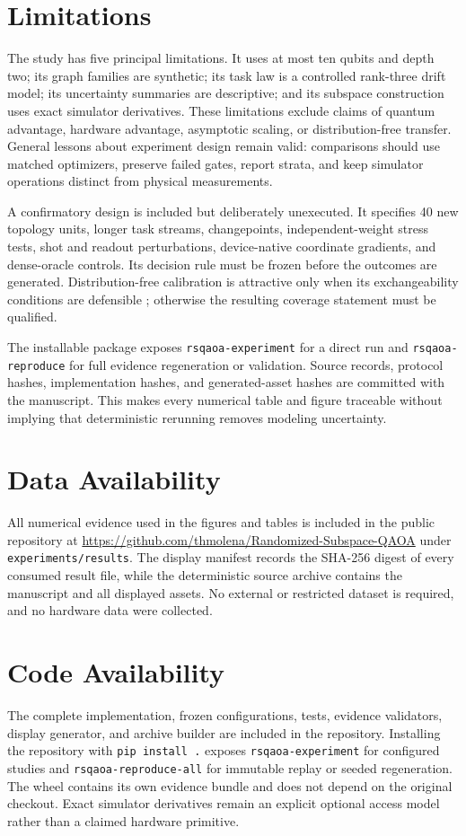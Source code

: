\documentclass[aps,prx,reprint,superscriptaddress,floatfix]{revtex4-2}
\begin{document}
\section*{Limitations}
The study has five principal limitations.  It uses at most ten qubits and
depth two; its graph families are synthetic; its task law is a controlled
rank-three drift model; its uncertainty summaries are descriptive; and its
subspace construction uses exact simulator derivatives.  These limitations
exclude claims of quantum advantage, hardware advantage, asymptotic scaling,
or distribution-free transfer.  General lessons about experiment design
remain valid: comparisons should use matched optimizers, preserve failed
gates, report strata, and keep simulator operations distinct from physical
measurements.

A confirmatory design is included but deliberately unexecuted.  It specifies
40 new topology units, longer task streams, changepoints, independent-weight
stress tests, shot and readout perturbations, device-native coordinate
gradients, and dense-oracle controls.  Its decision rule must be frozen before
the outcomes are generated.  Distribution-free calibration is attractive only
when its exchangeability conditions are defensible \citep{angelopoulos2021gentle,
barber2022exchangeability}; otherwise the resulting coverage statement must be
qualified.

The installable package exposes \texttt{rsqaoa-experiment} for a direct run and
\texttt{rsqaoa-reproduce} for full evidence regeneration or validation.
Source records, protocol hashes, implementation hashes, and generated-asset
hashes are committed with the manuscript.  This makes every numerical table
and figure traceable without implying that deterministic rerunning removes
modeling uncertainty.

\section*{Data Availability}
All numerical evidence used in the figures and tables is included in the
public repository at
\url{https://github.com/thmolena/Randomized-Subspace-QAOA} under
\texttt{experiments/results}.  The display manifest records
the SHA-256 digest of every consumed result file, while the deterministic
source archive contains the manuscript and all displayed assets.  No external
or restricted dataset is required, and no hardware data were collected.

\section*{Code Availability}
The complete implementation, frozen configurations, tests, evidence
validators, display generator, and archive builder are included in the
repository.  Installing the repository with \texttt{pip install .} exposes
\texttt{rsqaoa-experiment} for configured studies and
\texttt{rsqaoa-reproduce-all} for immutable replay or seeded regeneration.
The wheel contains its own evidence bundle and does not depend on the original
checkout.  Exact simulator
derivatives remain an explicit optional access model rather than a claimed
hardware primitive.
\end{document}
